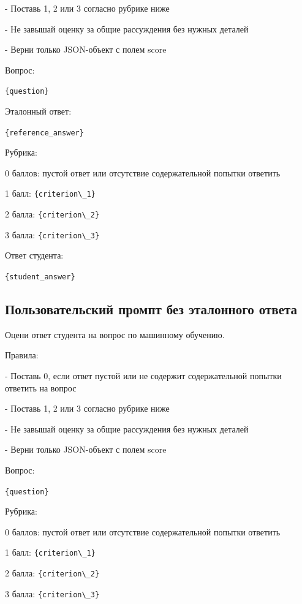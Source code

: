 - Поставь 1, 2 или 3 согласно рубрике ниже

- Не завышай оценку за общие рассуждения без нужных деталей

- Верни только JSON-объект с полем score

\vspace{1em}
Вопрос:

\verb|{question}|

\vspace{1em}
Эталонный ответ:

\verb|{reference_answer}|

\vspace{1em}
Рубрика:

0 баллов: пустой ответ или отсутствие содержательной попытки ответить

1 балл: \verb|{criterion\_1}|

2 балла: \verb|{criterion\_2}|

3 балла: \verb|{criterion\_3}|

\vspace{1em}
Ответ студента:

\verb|{student_answer}|


\subsection{Пользовательский промпт без эталонного ответа}
Оцени ответ студента на вопрос по машинному обучению.

\vspace{1em}
Правила:

- Поставь 0, если ответ пустой или не содержит содержательной попытки ответить на вопрос

- Поставь 1, 2 или 3 согласно рубрике ниже

- Не завышай оценку за общие рассуждения без нужных деталей

- Верни только JSON-объект с полем score

\vspace{1em}
Вопрос:

\verb|{question}|

\vspace{1em}
Рубрика:

0 баллов: пустой ответ или отсутствие содержательной попытки ответить

1 балл: \verb|{criterion\_1}|

2 балла: \verb|{criterion\_2}|

3 балла: \verb|{criterion\_3}|


